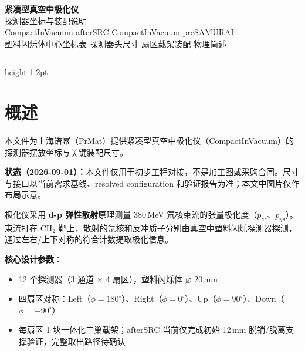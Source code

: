 \documentclass[UTF8,10pt,letterpaper,fontset=none]{ctexart}
\begin{document}
\begin{center}
{\sffamily\Huge\bfseries\color{SheetBlue} 紧凑型真空中极化仪}\\[4pt]
{\sffamily\Large\color{SheetDark} 探测器坐标与装配说明}\\[2pt]
{\sffamily\normalsize\color{SheetMuted}
CompactInVacuum-afterSRC \quad\textbar\quad CompactInVacuum-preSAMURAI}\\[6pt]
{\sffamily\small\color{SheetMuted}
塑料闪烁体中心坐标表 \textbullet{} 探测器头尺寸 \textbullet{} 扇区载架装配 \textbullet{} 物理简述}
\end{center}
\vspace{0.3em}
\hrule height 1.2pt
\vspace{0.6em}

\section{概述}

本文件为上海谱幂（PrMat）提供紧凑型真空中极化仪（CompactInVacuum）的探测器摆放坐标与关键装配尺寸。

\begin{tcolorbox}[colback=yellow!8,colframe=orange!65!black,boxsep=4pt,left=8pt,right=8pt,top=4pt,bottom=4pt]
\sffamily\small
\textbf{状态（2026-09-01）：}本文件仅用于初步工程对接，不是加工图或采购合同。尺寸与接口以当前需求基线、resolved configuration 和验证报告为准；本文中图片仅作布局示意。
\end{tcolorbox}

极化仪采用 \textbf{d-p 弹性散射}原理测量 380\,MeV 氘核束流的张量极化度（$p_{zz}$、$p_{yy}$）。束流打在 CH$_2$ 靶上，散射的氘核和反冲质子分别由真空中塑料闪烁探测器探测，通过左右/上下对称的符合计数提取极化信息。

\textbf{核心设计参数}：

\begin{itemize}[nosep,leftmargin=1.5em]
  \item 12 个探测器（3 通道 $\times$ 4 扇区），塑料闪烁体 \ensuremath{\varnothing} 20\,mm
  \item 四扇区对称：Left（$\phi=180^\circ$）、Right（$\phi=0^\circ$）、Up（$\phi=90^\circ$）、Down（$\phi=-90^\circ$）
  \item 每扇区 1 块一体化三巢载架；afterSRC 当前仅完成初始 12\,mm 脱销/脱离支撑验证，完整取出路径待确认
\end{itemize}
\end{document}
